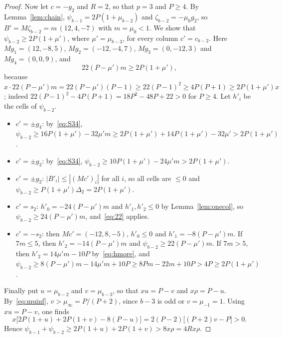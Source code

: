\documentclass[11pt]{article}
\theoremstyle{remark}
\begin{document}
\begin{proof}
Now let $c=-g_2$ and $R=2$, so that $p=3$ and $P\ge4$. By
Lemma~\ref{lem:chain}, $\psi_{b-1}=2P(1+\mu_{b-2})$ and
$\zeta_{b-2}=-\mu_0g_2$, so $B'=M\zeta_{b-2}=m\,(12,4,-7)$ with $m=\mu_0<1$.
We show that $\psi_{b-2}\ge2P(1+\mu')$, where $\mu'=\mu_{b-3}$, for every
column $c'=c_{b-2}$. Here $Mg_1=(12,-8,5)$, $Mg_2=(-12,-4,7)$,
$Mg_3=(0,-12,3)$ and $Mg_4=(0,0,9)$, and
\begin{equation}\label{eq:22}
22(P-\mu')m\ge2P(1+\mu'),
\end{equation}
because $x\cdot22(P-\mu')m=22(P-\mu')(P-1)\ge22(P-1)^2\ge4P(P+1)\ge
2P(1+\mu')x$; indeed $22(P-1)^2-4P(P+1)=18P^2-48P+22>0$ for $P\ge4$. Let
$h'_i$ be the cells of $\psi_{b-2}$.
\begin{itemize}
\item $c'=\pm g_4$: by~\eqref{eq:S34},
 $\psi_{b-2}\ge16P(1+\mu')-32\mu'm\ge2P(1+\mu')+14P(1+\mu')-32\mu'
 >2P(1+\mu')$.
\item $c'=\pm g_3$: by~\eqref{eq:S34},
 $\psi_{b-2}\ge10P(1+\mu')-24\mu'm>2P(1+\mu')$.
\item $c'=\pm g_2$: $|B'_i|\le|(Mc')_i|$ for all $i$, so all cells are
 $\le0$ and $\psi_{b-2}\ge P(1+\mu')\Delta_2=2P(1+\mu')$.
\item $c'=s_2$: $h'_0=-24(P-\mu')m$ and $h'_1,h'_2\le0$ by
 Lemma~\ref{lem:onecol}, so $\psi_{b-2}\ge24(P-\mu')m$, and~\eqref{eq:22}
 applies.
\item $c'=-s_2$: then $Mc'=(-12,8,-5)$, $h'_0\le0$ and $h'_1=-8(P-\mu')m$.
 If $7m\le5$, then $h'_2=-14(P-\mu')m$ and $\psi_{b-2}\ge22(P-\mu')m$. If
 $7m>5$, then $h'_2=14\mu'm-10P$ by~\eqref{eq:hmore}, and
 $\psi_{b-2}\ge8(P-\mu')m-14\mu'm+10P\ge8Pm-22m+10P>4P\ge2P(1+\mu')$.
\end{itemize}
Finally put $u=\mu_{b-2}$ and $v=\mu_{b-3}$, so that $xu=P-v$ and
$x\rho=P-u$. By~\eqref{eq:muinf}, $v>\mu_\infty=P/(P+2)$, since $b-3$ is odd
or $v=\mu_{-1}=1$. Using $xu=P-v$, one finds
\[
x\bigl[2P(1+u)+2P(1+v)-8(P-u)\bigr]=2(P-2)\bigl[(P+2)v-P\bigr]>0.
\]
Hence $\psi_{b-1}+\psi_{b-2}\ge2P(1+u)+2P(1+v)>8x\rho=4Rx\rho$.
\end{proof}
\end{document}

